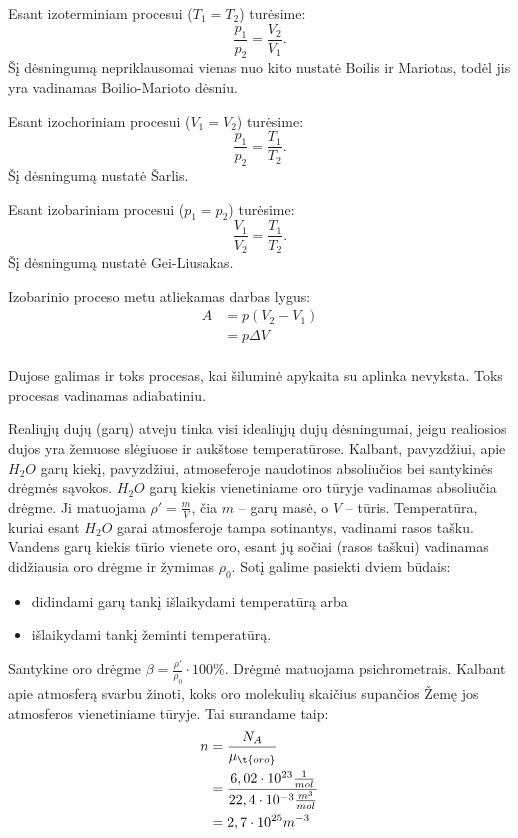 Esant izoterminiam procesui ($T_{1} = T_{2}$) turėsime:
\begin{equation*}
  \frac{p_{1}}{p_{2}} = \frac{V_{2}}{V_{1}}.
\end{equation*}
Šį dėsningumą nepriklausomai vienas nuo kito nustatė Boilis ir Mariotas,
todėl jis yra vadinamas Boilio-Marioto dėsniu.

Esant izochoriniam procesui ($V_{1} = V_{2}$) turėsime:
\begin{equation*}
  \frac{p_{1}}{p_{2}} = \frac{T_{1}}{T_{2}}.
\end{equation*}
Šį dėsningumą nustatė Šarlis.

Esant izobariniam procesui ($p_{1} = p_{2}$) turėsime:
\begin{equation*}
  \frac{V_{1}}{V_{2}} = \frac{T_{1}}{T_{2}}.
\end{equation*}
Šį dėsningumą nustatė Gei-Liusakas.

Izobarinio proceso metu atliekamas darbas lygus:
\begin{align*}
  A
  &= p\left( V_{2} - V_{1} \right) \\
  &= p \Delta V \\
\end{align*}

Dujose galimas ir toks procesas, kai šiluminė apykaita su aplinka
nevyksta. Toks procesas vadinamas adiabatiniu.

Realiųjų dujų (garų) atveju tinka visi idealiųjų dujų dėsningumai,
jeigu realiosios dujos yra žemuose slėgiuose ir aukštose temperatūrose.
Kalbant, pavyzdžiui, apie $H_{2}O$ garų kiekį, pavyzdžiui, atmoseferoje
naudotinos absoliučios bei santykinės drėgmės sąvokos. $H_{2}O$
garų kiekis vienetiniame oro tūryje vadinamas absoliučia drėgme.
Ji matuojama $\rho' = \frac{m}{V}$, čia $m$ – garų masė, o
$V$ – tūris. Temperatūra, kuriai esant $H_{2}O$ garai atmosferoje
tampa sotinantys, vadinami rasos tašku. Vandens garų kiekis tūrio
vienete oro, esant jų sočiai (rasos taškui) vadinamas didžiausia
oro drėgme ir žymimas $\rho_{0}$. Sotį galime pasiekti dviem
būdais:
\begin{itemize}
  \item didindami garų tankį išlaikydami temperatūrą arba
  \item išlaikydami tankį žeminti temperatūrą.
\end{itemize}
Santykine oro drėgme $\beta = \frac{\rho'}{\rho_{0}} \cdot 100 \%$.
Drėgmė matuojama psichrometrais. Kalbant apie atmosferą svarbu
žinoti, koks oro molekulių skaičius supančios Žemę jos atmosferos
vienetiniame tūryje. Tai surandame taip:
\begin{align*}
  n
  &= \frac{N_{A}}{\mu_{\t{oro}}} \\
  &= \frac{6,02 \cdot 10^{23} \frac{1}{mol}}%
    {22,4 \cdot 10 ^{-3} \frac{m^{3}}{mol}} \\
  &= 2,7 \cdot 10 ^{25} m^{-3} \\
\end{align*}

